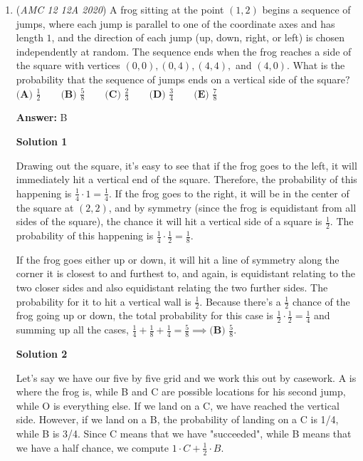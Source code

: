 \begin{enumerate}
	\item (\textit{AMC 12 12A 2020}) A frog sitting at the point $(1, 2)$ begins a sequence of jumps, where each jump is parallel to one of the coordinate axes and has length $1$, and the direction of each jump (up, down, right, or left) is chosen independently at random. The sequence ends when the frog reaches a side of the square with vertices $(0,0), (0,4), (4,4),$ and $(4,0)$. What is the probability that the sequence of jumps ends on a vertical side of the square$?$
$\textbf{(A) } \frac{1}{2} \qquad \textbf{(B) } \frac{5}{8} \qquad \textbf{(C) } \frac{2}{3} \qquad \textbf{(D) } \frac{3}{4} \qquad \textbf{(E) } \frac{7}{8}$

 \textbf{Answer: }B



\textbf{Solution 1}

Drawing out the square, it's easy to see that if the frog goes to the left, it will immediately hit a vertical end of the square. Therefore, the probability of this happening is $\frac{1}{4} \cdot 1 = \frac{1}{4}$. If the frog goes to the right, it will be in the center of the square at $(2,2)$, and by symmetry (since the frog is equidistant from all sides of the square), the chance it will hit a vertical side of a square is $\frac{1}{2}$. The probability of this happening is $\frac{1}{4} \cdot \frac{1}{2} = \frac{1}{8}$.

 
If the frog goes either up or down, it will hit a line of symmetry along the corner it is closest to and furthest to, and again, is equidistant relating to the two closer sides and also equidistant relating the two further sides. The probability for it to hit a vertical wall is $\frac{1}{2}$. Because there's a $\frac{1}{2}$ chance of the frog going up or down, the total probability for this case is $\frac{1}{2} \cdot \frac{1}{2} = \frac{1}{4}$ and summing up all the cases, $\frac{1}{4} + \frac{1}{8} + \frac{1}{4} = \frac{5}{8}       \implies \boxed{\textbf{(B) } \frac{5}{8}}$.

 



\textbf{Solution 2}

Let's say we have our five by five grid and we work this out by casework. A is where the frog is, while B and C are possible locations for his second jump, while O is everything else. If we land on a C, we have reached the vertical side. However, if we land on a B, the probability of landing on a C is 1/4, while B is 3/4. Since C means that we have "succeeded", while B means that we have a half chance, we compute $1 \cdot C + \frac{1}{2} \cdot B$. 


\end{enumerate}
